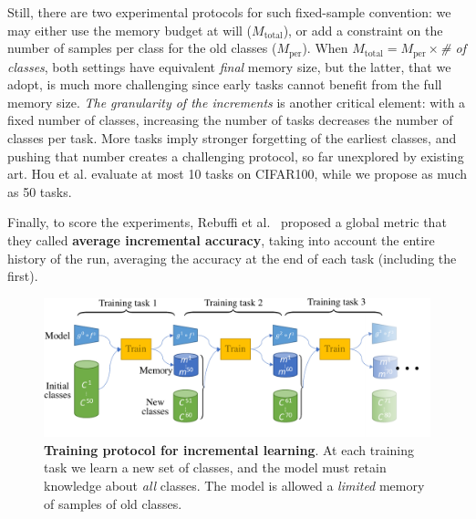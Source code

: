 Still, there are two experimental protocols for such fixed-sample convention: we may either use the
memory budget at will ($M_\mathrm{total}$), or add a constraint on the number of samples per class
for the old classes ($M_\mathrm{per}$). When $M_\mathrm{total}=M_\mathrm{per}\times$\textit{\# of
    classes}, both settings have equivalent \textit{final} memory size, but the latter, that we adopt,
is much more challenging since early tasks cannot benefit from the full memory size. \textit{The
    granularity of the increments} is another critical element: with a fixed number of classes,
increasing the number of tasks decreases the number of classes per task. More tasks imply stronger
forgetting of the earliest classes, and pushing that number creates a challenging protocol, so far
unexplored by existing art. Hou et al. evaluate at most 10 tasks on CIFAR100, while we propose as
much as 50 tasks.

Finally, to score the experiments, Rebuffi et al.~\citep{rebuffi2017icarl} proposed a global metric
that they called \textbf{average incremental accuracy}, taking into account the entire history of
the run, averaging the accuracy at the end of each task (including the first).

\begin{figure}[tb]
    \begin{center}
        \includegraphics[width=0.8\linewidth]{images/podnet/protocol}
    \end{center}
    \caption{\textbf{Training protocol for incremental learning}. At each training task we learn a
        new set of classes, and the model must retain knowledge about \textit{all} classes. The
        model is allowed a \textit{limited} memory of samples of old classes.}
    \label{fig:protocol}
\end{figure}

